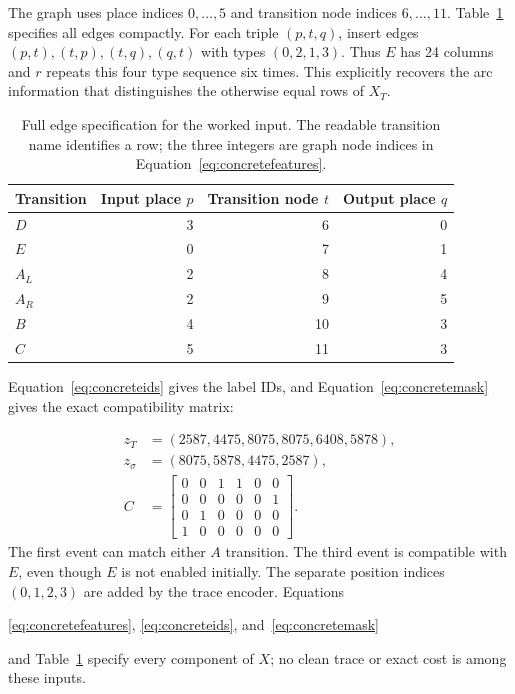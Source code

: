 The graph uses place indices $0,\ldots,5$ and transition node indices $6,\ldots,11$. Table~\ref{tab:concreteedges} specifies all edges compactly. For each triple $(p,t,q)$, insert edges $(p,t),(t,p),(t,q),(q,t)$ with types $(0,2,1,3)$. Thus $E$ has 24 columns and $r$ repeats this four type sequence six times. This explicitly recovers the arc information that distinguishes the otherwise equal rows of $X_T$.

\begin{table}[!t]
\caption{Full edge specification for the worked input. The readable transition name identifies a row; the three integers are graph node indices in Equation~\eqref{eq:concretefeatures}.}
\label{tab:concreteedges}
\centering
\begin{tabular}{@{}lrrr@{}}
\toprule
Transition & Input place $p$ & Transition node $t$ & Output place $q$\\
\midrule
$D$ & 3 & 6 & 0\\
$E$ & 0 & 7 & 1\\
$A_L$ & 2 & 8 & 4\\
$A_R$ & 2 & 9 & 5\\
$B$ & 4 & 10 & 3\\
$C$ & 5 & 11 & 3\\
\bottomrule
\end{tabular}
\end{table}

\begin{revised}Equation~\eqref{eq:concreteids} gives the label IDs, and Equation~\eqref{eq:concretemask} gives the exact compatibility matrix:\end{revised}
\begin{align}
 z_T&=(2587,4475,8075,8075,6408,5878),\nonumber\\
 z_\sigma&=(8075,5878,4475,2587),\label{eq:concreteids}\\
 C&=\begin{bmatrix}
 0&0&1&1&0&0\\0&0&0&0&0&1\\0&1&0&0&0&0\\1&0&0&0&0&0
 \end{bmatrix}.\label{eq:concretemask}
\end{align}
The first event can match either $A$ transition. The third event is compatible with $E$, even though $E$ is not enabled initially. The separate position indices $(0,1,2,3)$ are added by the trace encoder. Equations~\begin{revised}\eqref{eq:concretefeatures}, \eqref{eq:concreteids}, and~\eqref{eq:concretemask}\end{revised} and Table~\ref{tab:concreteedges} specify every component of $X$; no clean trace or exact cost is among these inputs.

